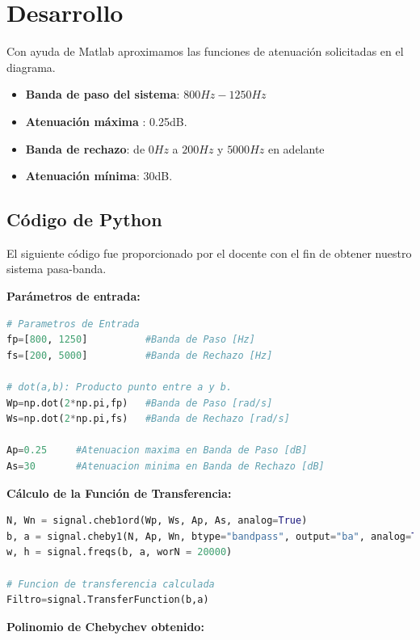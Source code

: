 \newpage
\section{Desarrollo}

\hspace{1mm} Con ayuda de Matlab aproximamos las funciones de atenuación solicitadas en el diagrama.

\begin{itemize}
	\item \textbf{Banda de paso del sistema}:  $800Hz - 1250Hz$
    \item \textbf{Atenuación máxima} :  0.25dB.
	\item \textbf{Banda de rechazo}: de $0Hz$ a
 $200Hz$ y $5000Hz$ en adelante
    \item \textbf{Atenuación mínima}: 30dB.
\end{itemize}

\subsection{Código de Python}
\hspace{1mm} El siguiente código fue proporcionado por el docente con el fin de obtener nuestro sistema pasa-banda.


\textbf{Parámetros de entrada:}

\begin{lstlisting}[language=Python]
# Parametros de Entrada
fp=[800, 1250]          #Banda de Paso [Hz]
fs=[200, 5000]          #Banda de Rechazo [Hz]

# dot(a,b): Producto punto entre a y b.
Wp=np.dot(2*np.pi,fp)   #Banda de Paso [rad/s]
Ws=np.dot(2*np.pi,fs)   #Banda de Rechazo [rad/s]

Ap=0.25     #Atenuacion maxima en Banda de Paso [dB]
As=30       #Atenuacion minima en Banda de Rechazo [dB]
\end{lstlisting}

\textbf{Cálculo de la Función de Transferencia:}

\begin{lstlisting}[language=Python]
N, Wn = signal.cheb1ord(Wp, Ws, Ap, As, analog=True)
b, a = signal.cheby1(N, Ap, Wn, btype="bandpass", output="ba", analog=True)
w, h = signal.freqs(b, a, worN = 20000)

# Funcion de transferencia calculada
Filtro=signal.TransferFunction(b,a)
\end{lstlisting}

\textbf{Polinomio de Chebychev obtenido: }

